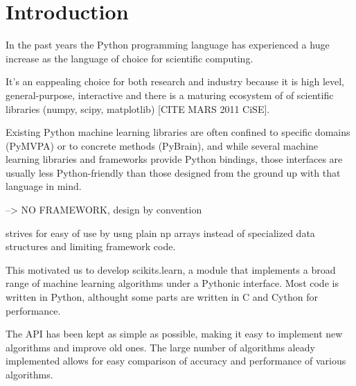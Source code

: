 \documentclass[twoside,11pt]{article}
\begin{document}


\section{Introduction}
In the past years the Python programming language has experienced a
huge increase as the language of choice for scientific computing. 

It's an eappealing choice for both research and industry because it is
high level, general-purpose, interactive and there is a maturing ecosystem of 
of scientific libraries (numpy, scipy, matplotlib) [CITE MARS 2011 CiSE].


Existing Python machine learning libraries  are often confined to specific domains
(PyMVPA) or to concrete methods (PyBrain), and while several machine
learning libraries and frameworks provide Python bindings, those
interfaces are usually less Python-friendly than those designed
from the ground up with that language in mind.


--> NO FRAMEWORK, design by convention

strives for easy of use by usng plain np arrays instead of specialized
data structures and limiting framework code.


This motivated us to develop scikits.learn, a module that implements a
broad range of machine learning algorithms under a Pythonic
interface. Most code is written in Python, althought some parts are
written in C and Cython for performance.


The API has been kept as simple as possible, making it easy to
implement new algorithms and improve old ones. The large number of
algorithms aleady implemented allows for easy comparison of accuracy
and performance of various algorithms.
\end{document}
